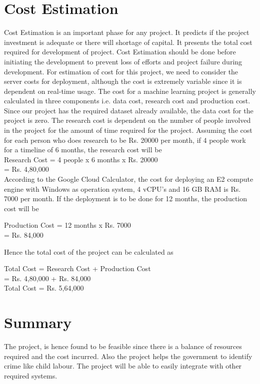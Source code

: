 \section{Cost Estimation}
Cost Estimation is an important phase for any project. It predicts if the project investment is adequate or there will shortage of capital. It presents the total cost required for development of project. Cost Estimation should be done before initiating the development to prevent loss of efforts and project failure during development. For estimation of cost for this project, we need to consider the server costs for deployment, although the cost is extremely variable since it is dependent on real-time usage.
The cost for a machine learning project is generally calculated in three components i.e. data cost, research cost and production cost. Since our project has the required dataset already available, the data cost for the project is zero. The research cost is dependent on the number of people involved in the project for the amount of time required for the project. Assuming the cost for each person who does research to be Rs. 20000 per month, if 4 people work for a timeline of 6 months, the research cost will be\\

Research Cost = 4 people x 6 months x Rs. 20000\\
= Rs. 4,80,000\\

According to the Google Cloud Calculator, the cost for deploying an E2 compute engine with Windows as operation system, 4 vCPU’s and 16 GB RAM is Rs. 7000 per month. If the deployment is to be done for 12 months, the production cost will be
 
Production Cost = 12 months x Rs. 7000\\
= Rs. 84,000

Hence the total cost of the project can be calculated as

Total Cost = Research Cost + Production Cost\\
= Rs. 4,80,000 + Rs. 84,000\\
Total Cost = Rs. 5,64,000


\section{Summary}
The project, is hence found to be feasible since there is a balance of resources required and the cost incurred. Also the project helps the government to identify crime like child labour. The project will be able to easily integrate with other required systems.